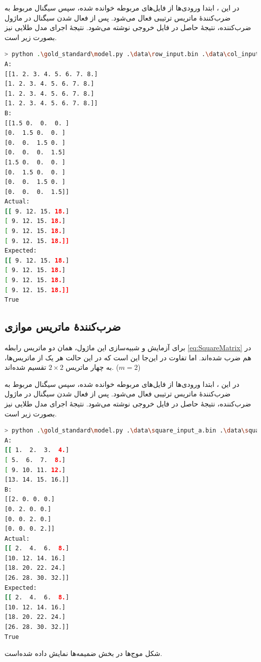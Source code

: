 \documentclass[conference]{IEEEtran-ModifiedForMVIP}
\begin{document}
در این
،
ابتدا ورودی‌ها از فایل‌های مربوطه خوانده شده، سپس سیگنال
مربوط به ضرب‌کنندهٔ ماتریس ترتیبی فعال می‌شود. پس از فعال شدن سیگنال
در ماژول ضرب‌کننده، نتیجهٔ حاصل در فایل خروجی نوشته می‌شود.
نتیجهٔ اجرای مدل طلایی نیز بصورت زیر است.

\begin{latin}
\begin{lstlisting}[language=Bash]
> python .\gold_standard\model.py .\data\row_input.bin .\data\col_input.bin .\sim_out.bin 4 8 4
A:
[[1. 2. 3. 4. 5. 6. 7. 8.]
[1. 2. 3. 4. 5. 6. 7. 8.]
[1. 2. 3. 4. 5. 6. 7. 8.]
[1. 2. 3. 4. 5. 6. 7. 8.]]
B:
[[1.5 0.  0.  0. ]
[0.  1.5 0.  0. ]
[0.  0.  1.5 0. ]
[0.  0.  0.  1.5]
[1.5 0.  0.  0. ]
[0.  1.5 0.  0. ]
[0.  0.  1.5 0. ]
[0.  0.  0.  1.5]]
Actual:
[[ 9. 12. 15. 18.]
[ 9. 12. 15. 18.]
[ 9. 12. 15. 18.]
[ 9. 12. 15. 18.]]
Expected:
[[ 9. 12. 15. 18.]
[ 9. 12. 15. 18.]
[ 9. 12. 15. 18.]
[ 9. 12. 15. 18.]]
True
\end{lstlisting}
\end{latin}
\subsection{
    ضرب‌کنندهٔ ماتریس موازی
}
برای آزمایش و شبیه‌سازی این ماژول، همان دو ماتریس
رابطه 
\ref{eq:SquareMatrix}
در هم ضرب شده‌اند. اما تفاوت در این‌جا این است که در این حالت هر یک از ماتریس‌ها، به چهار ماتریس 
$2 \times 2$
تقسیم شده‌اند.
($m = 2$)


در این
،
ابتدا ورودی‌ها از فایل‌های مربوطه خوانده شده، سپس سیگنال
مربوط به ضرب‌کنندهٔ ماتریس ترتیبی فعال می‌شود. پس از فعال شدن سیگنال
در ماژول ضرب‌کننده، نتیجهٔ حاصل در فایل خروجی نوشته می‌شود.
نتیجهٔ اجرای مدل طلایی نیز بصورت زیر است.

\begin{latin}
\begin{lstlisting}[language=Bash]
> python .\gold_standard\model.py .\data\square_input_a.bin .\data\square_input_b.bin .\sim_out.bin 4 4 4
A:
[[ 1.  2.  3.  4.]
[ 5.  6.  7.  8.]
[ 9. 10. 11. 12.]
[13. 14. 15. 16.]]
B:
[[2. 0. 0. 0.]
[0. 2. 0. 0.]
[0. 0. 2. 0.]
[0. 0. 0. 2.]]
Actual:
[[ 2.  4.  6.  8.]
[10. 12. 14. 16.]
[18. 20. 22. 24.]
[26. 28. 30. 32.]]
Expected:
[[ 2.  4.  6.  8.]
[10. 12. 14. 16.]
[18. 20. 22. 24.]
[26. 28. 30. 32.]]
True
\end{lstlisting}
\end{latin}
شکل موج‌ها
در بخش ضمیمه‌ها نمایش داده شده‌است.
\end{document}
